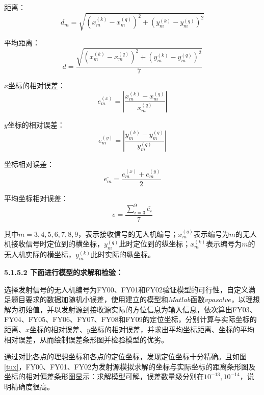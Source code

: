 \documentclass[12pt]{ctexart}
\begin{document}
\begin{spacing}{1.5}
距离：
\begin{equation}
	d_m=\sqrt{ (x_{m}^{(k)}-x_{m}^{(q)})^2 + (y_{m}^{(k)}-y_{m}^{(q)})^2 }
\end{equation}

平均距离：
\begin{equation}
	d = \frac{\sqrt{ (x_{m}^{(k)}-x_{m}^{(q)})^2 + (y_{m}^{(k)}-y_{m}^{(q)})^2 }}{7} 
\end{equation}

$x$坐标的相对误差：
\begin{equation}
	e_{m}^{(x)} = |\frac{x_{m}^{(k)}-x_{m}^{(q)}}{x_{m}^{(q)}}|
\end{equation}

$y$坐标的相对误差：
\begin{equation}
	e_{m}^{(y)} = |\frac{y_{m}^{(k)}-y_{m}^{(q)}}{y_{m}^{(q)}}|
\end{equation}

坐标相对误差：
\begin{equation}
	\overline{e_m} = \frac{e_{m}^{(x)}+e_{m}^{(y)}}{2}
\end{equation}

平均坐标相对误差：
\begin{equation}
	\overline{e} = \frac{\sum_{i=3}^{9}\overline{e_i}}{7}
\end{equation}

其中$m=3,4,5,6,7,8,9$，表示接收信号的无人机编号；$x_m^{(q)}$表示编号为$m$的无人机接收信号时定位到的横坐标，$y_m^{(q)}$此时定位到的纵坐标；$x_m^{(k)}$表示编号为$m$的无人机实际的横坐标，$y_m^{(k)}$此时实际的纵坐标。

\textbf{5.1.5.2 下面进行模型的求解和检验：}

选择发射信号的无人机编号为FY00、FY01和FY02验证模型的可行性，自定义满足题目要求的数据加随机小误差，使用建立的模型和$Matlab$函数$vpasolve$，以理想解为初始值，并以发射源到接收源实际的方位信息为输入信息，依次算出FY03、FY04、FY05、FY06、FY07、FY08和FY09的定位坐标，分别计算与实际坐标的距离、$x$坐标的相对误差、$y$坐标的相对误差，并求出平均坐标距离、坐标的平均相对误差，从而绘制误差条形图并检验模型的优劣。

通过对比各点的理想坐标和各点的定位坐标，发现定位坐标十分精确。且如图\ref{tux}，FY00、FY01、FY02为发射源模拟求解的坐标与实际坐标的距离条形图及坐标的相对偏差条形图显示：求解模型可解，误差数量级分别在$10^{-13},10^{-14}$，说明精确度很高。


\end{spacing}
\end{document}
